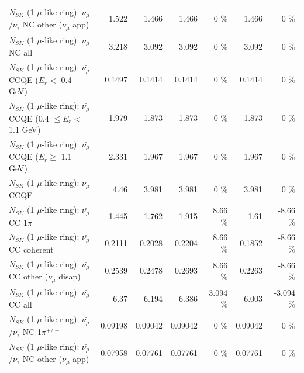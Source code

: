 \begin{table}
\begin{tabular}{| l | r | r | r  r | r  r |}
     $N_{SK}$ (1 $\mu$-like ring): $\nu_\mu$/$\nu_\tau$ NC other ($\nu_\mu$ app) &           1.522 &           1.466 &           1.466 &        0 \%  &           1.466 &        0 \%  \\ 
                                $N_{SK}$ (1 $\mu$-like ring): $\nu_{\mu}$ NC all &           3.218 &           3.092 &           3.092 &        0 \%  &           3.092 &        0 \%  \\ 
\hline
\hline
\hline
          $N_{SK}$ (1 $\mu$-like ring): $\bar{\nu_\mu}$ CCQE ($E_{r} <$ 0.4 GeV) &          0.1497 &          0.1414 &          0.1414 &        0 \%  &          0.1414 &        0 \%  \\ 
 $N_{SK}$ (1 $\mu$-like ring): $\bar{\nu_\mu}$ CCQE (0.4 $\leq E_{r} <$ 1.1 GeV) &           1.979 &           1.873 &           1.873 &        0 \%  &           1.873 &        0 \%  \\ 
       $N_{SK}$ (1 $\mu$-like ring): $\bar{\nu_\mu}$ CCQE ($E_{r} \geq$ 1.1 GeV) &           2.331 &           1.967 &           1.967 &        0 \%  &           1.967 &        0 \%  \\ 
\hline
                              $N_{SK}$ (1 $\mu$-like ring): $\bar{\nu_\mu}$ CCQE &            4.46 &           3.981 &           3.981 &        0 \%  &           3.981 &        0 \%  \\ 
                         $N_{SK}$ (1 $\mu$-like ring): $\bar{\nu_\mu}$ CC 1$\pi$ &           1.445 &           1.762 &           1.915 &     8.66 \%  &            1.61 &    -8.66 \%  \\ 
                       $N_{SK}$ (1 $\mu$-like ring): $\bar{\nu_\mu}$ CC coherent &          0.2111 &          0.2028 &          0.2204 &     8.66 \%  &          0.1852 &    -8.66 \%  \\ 
        $N_{SK}$ (1 $\mu$-like ring): $\bar{\nu_\mu}$ CC other ($\nu_\mu$ disap) &          0.2539 &          0.2478 &          0.2693 &     8.66 \%  &          0.2263 &    -8.66 \%  \\ 
                          $N_{SK}$ (1 $\mu$-like ring): $\bar{\nu_{\mu}}$ CC all &            6.37 &           6.194 &           6.386 &    3.094 \%  &           6.003 &   -3.094 \%  \\ 
\hline
  $N_{SK}$ (1 $\mu$-like ring): $\bar{\nu_\mu}$/$\bar{\nu_\tau}$ NC 1$\pi^{+/-}$ &         0.09198 &         0.09042 &         0.09042 &        0 \%  &         0.09042 &        0 \%  \\ 
$N_{SK}$ (1 $\mu$-like ring): $\bar{\nu_\mu}$/$\bar{\nu_\tau}$ NC other ($\nu_\mu$ app) &         0.07958 &         0.07761 &         0.07761 &        0 \%  &         0.07761 &        0 \%  \\ 

\end{tabular}
\end{table}
